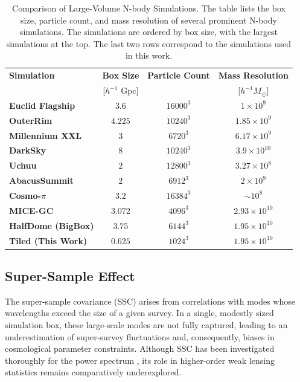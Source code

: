 \begin{table}[ht]
    \centering
    \caption[Comparison of Large-Volume N-body Simulations]{
        Comparison of Large-Volume N-body Simulations. The table lists the box size, particle count, and mass resolution of several prominent N-body simulations. The simulations are ordered by box size, with the largest simulations at the top. The last two rows correspond to the simulations used in this work. 
    }
    \label{tab:simulation_comparison}
    \begin{tabular}{lccc}
    \toprule
    \textbf{Simulation} & \textbf{Box Size} & \textbf{Particle Count} & \textbf{Mass Resolution} \\
    & [$h^{-1}$ Gpc] & & [$h^{-1} M_{\odot}$] \\
    \midrule
    \textbf{Euclid Flagship} & $3.6$ & $16000^{3}$ & $1\times10^{9}$ \\
    \textbf{OuterRim} & $4.225$ & $10240^{3}$ & $1.85\times10^{9}$ \\
    \textbf{Millennium XXL} & $3$ & $6720^{3}$ & $6.17\times10^{9}$ \\
    \textbf{DarkSky} & $8$ & $10240^{3}$ & $3.9\times10^{10}$ \\
    \textbf{Uchuu} & $2$ & $12800^{3}$ & $3.27\times10^{8}$ \\
    \textbf{AbacusSummit} & $2$ & $6912^3$ & $2\times10^{9}$ \\
    \textbf{Cosmo-$\pi$} & $3.2$ & $16384^{3}$ & $\sim 10^{8}$ \\
    \textbf{MICE-GC} & $3.072$ & $4096^3$ & $2.93\times10^{10}$ \\
    \midrule
    \textbf{HalfDome (BigBox)} & $3.75$ & $6144^{3}$ & $1.95\times10^{10}$ \\
    \textbf{Tiled (This Work)} & $0.625$ & $1024^{3}$ & $1.95\times10^{10}$ \\
    \bottomrule
    \end{tabular}
\end{table}

\subsection{Super-Sample Effect} 
The super-sample covariance (SSC) arises from correlations with modes whose wavelengths exceed the size of a given survey. In a single, modestly sized simulation box, these large-scale modes are not fully captured, leading to an underestimation of super-survey fluctuations and, consequently, biases in cosmological parameter constraints. Although SSC has been investigated thoroughly for the power spectrum \citep{PhysRevD.87.123504, 2017JCAP...11..051B, 2018JCAP...06..015B}, its role in higher-order weak lensing statistics remains comparatively underexplored.

